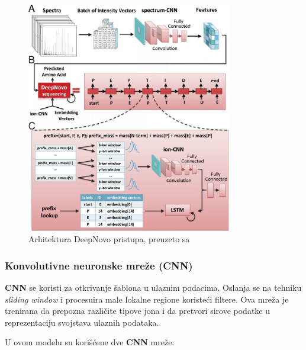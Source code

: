 \documentclass[12pt,oneside]{memoir}
\begin{document}
\begin{figure}[H]
\centering
\includegraphics[width=0.8\textwidth]{images/deep_novo_architecture.jpeg}
\caption{Arhitektura DeepNovo pristupa, preuzeto sa \cite{deepnovo}}
\label{fig:arhitektura}
\end{figure}

\subsubsection{Konvolutivne neuronske mreže (CNN)}
\textbf{CNN} se koristi za otkrivanje šablona u ulaznim podacima. Oslanja se na tehniku \emph{sliding window} i procesuira male lokalne regione koristeći filtere. Ova mreža je trenirana da prepozna različite tipove jona i da pretvori sirove podatke u reprezentaciju svojstava ulaznih podataka.

U ovom modelu su korišćene dve \textbf{CNN} mreže:
\end{document}
